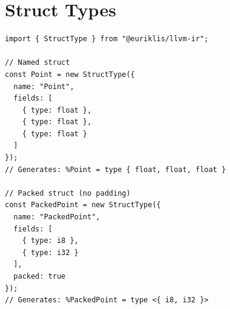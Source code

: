 \section{Struct Types}

\begin{lstlisting}[style=ts]
import { StructType } from "@euriklis/llvm-ir";

// Named struct
const Point = new StructType({
  name: "Point",
  fields: [
    { type: float },
    { type: float },
    { type: float }
  ]
});
// Generates: %Point = type { float, float, float }

// Packed struct (no padding)
const PackedPoint = new StructType({
  name: "PackedPoint",
  fields: [
    { type: i8 },
    { type: i32 }
  ],
  packed: true
});
// Generates: %PackedPoint = type <{ i8, i32 }>
\end{lstlisting}

